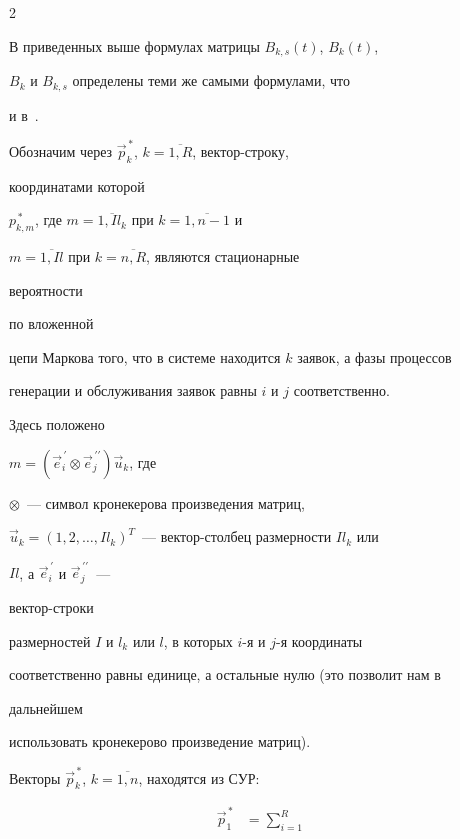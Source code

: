\begin{multicols}{2}





В приведенных выше формулах матрицы $B_{k,s}(t)$, $B_k(t)$,


$B_k$ и $B_{k,s}$ определены теми же самыми формулами, что


и в~\cite{PSCh06}.





Обозначим через $\vec p_k^{\,*}$, $k=\overline{1,R}$, вектор-строку,


координатами которой


$p_{k,m}^{\,*}$, где $m=\overline{1,I l_k}$ при $k=\overline{1,n-1}$ и


$m=\overline{1,Il}$ при $k=\overline{n,R}$, являются стационарные


вероятности


по вложенной


цепи Маркова того, что в системе находится $k$ заявок, а фазы процессов


генерации и обслуживания заявок равны $i$ и $j$ соответственно.


Здесь положено


$m=(\vec e^{\,\prime}_i\otimes \vec e^{\,\prime\prime}_j) \vec u_k$, где


$\otimes$~--- символ кронекерова произведения матриц,


$\vec u_k=(1,2,\ldots,Il_k)^T$~--- вектор-столбец размерности $Il_k$ или


$Il$, а $\vec e^{\,\prime}_i$ и $\vec e^{\,\prime\prime}_j$~---


вектор-строки


размерностей $I$ и $l_k$ или $l$, в которых $i$-я и $j$-я координаты


соответственно равны единице, а остальные нулю (это позволит нам в


дальнейшем


использовать кронекерово произведение матриц).





Векторы $\vec p^{\,*}_{k}$, $k=\overline{1,n}$, находятся из СУР:


\begin{align}


\label{ES_1}


\vec p_1^{\,*} & =


\sum\limits_{i=1}^{R}



\end{align}
\end{multicols}
